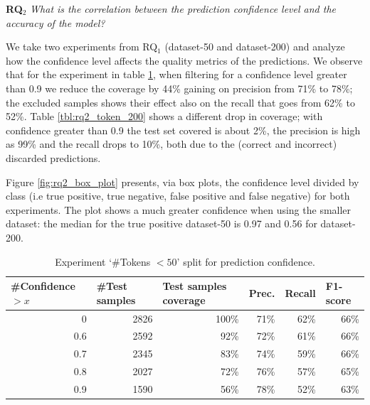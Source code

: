 \textbf{RQ$_2$} \textit{What is the correlation between the prediction confidence level and the accuracy of the model?}

We take two experiments from RQ$_1$ (dataset-50 and dataset-200) and analyze how the confidence level affects the quality metrics of the predictions. We observe that for the experiment in table \ref{tbl:rq2_token_50}, when filtering for a confidence level greater than 0.9 we reduce the coverage by 44\% gaining on precision from 71\% to 78\%; the excluded samples shows their effect also on the recall that goes from 62\% to 52\%. 
Table \ref{tbl:rq2_token_200} shows a different drop in coverage; with confidence greater than 0.9 the test set covered is about 2\%, the precision is high as 99\% and the recall drops to 10\%, both due to the (correct and incorrect) discarded predictions.
 
Figure \ref{fig:rq2_box_plot} presents, via box plots, the confidence level divided by class (i.e true positive, true negative, false positive and false negative) for both experiments. The plot shows a much greater confidence when using the smaller dataset: the median for the true positive dataset-50 is 0.97 and 0.56 for dataset-200.

\begin{table}[h!]
\centering
\caption{Experiment `\#Tokens $< 50$' split for prediction confidence.\label{tbl:rq2_token_50}}

\begin{tabular}{|r|r|r|r|r|r|}
\hline
  \multicolumn{1}{|l|}{\#Confidence $> x$} &
  \multicolumn{1}{l|}{\#Test samples} &
  \multicolumn{1}{l|}{Test samples coverage} &
  \multicolumn{1}{l|}{Prec.} &
  \multicolumn{1}{l|}{Recall} &
  \multicolumn{1}{l|}{F1-score} \\ 
\hline
0   & 2826 & 100\% & 71\% & 62\% & 66\% \\
0.6 & 2592 & 92\%  & 72\% & 61\% & 66\% \\
0.7 & 2345 & 83\%  & 74\% & 59\% & 66\% \\
0.8 & 2027 & 72\%  & 76\% & 57\% & 65\% \\
0.9 & 1590 & 56\%  & 78\% & 52\% & 63\% \\
\hline
\end{tabular}
\end{table}

